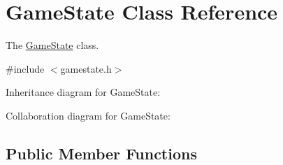 \hypertarget{class_game_state}{}\section{Game\+State Class Reference}
\label{class_game_state}


The \hyperlink{class_game_state}{Game\+State} class.  




{\ttfamily \#include $<$gamestate.\+h$>$}



Inheritance diagram for Game\+State\+:


Collaboration diagram for Game\+State\+:
\subsection*{Public Member Functions}
